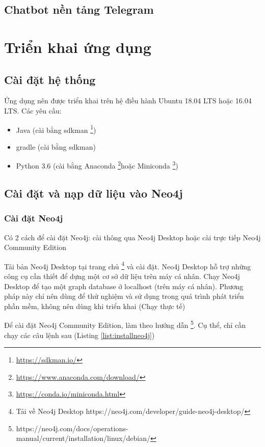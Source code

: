 \subsection{Chatbot nền tảng Telegram}

\section{Triển khai ứng dụng}

\subsection{Cài đặt hệ thống}

Ứng dụng nên được triển khai trên hệ điều hành Ubuntu 18.04 LTS hoặc 16.04 LTS. Các yêu cầu: 

\begin{itemize}
\item Java (cài bằng sdkman \footnote{\url{https://sdkman.io/}})
\item gradle (cài bằng sdkman)
\item Python 3.6 (cài bằng Anaconda \footnote{\url{https://www.anaconda.com/download/}}hoặc Miniconda \footnote{\url{https://conda.io/miniconda.html}})
\end{itemize}

\subsection{Cài đặt và nạp dữ liệu vào Neo4j}
\subsubsection{Cài đặt Neo4j}

Có 2 cách để cài đặt Neo4j: cài thông qua Neo4j Desktop hoặc cài trực tiếp Neo4j Community Edition

Tải bản Neo4j Desktop tại trang chủ \footnote{Tải về Neo4j Desktop https://neo4j.com/developer/guide-neo4j-desktop/} và cài đặt. Neo4j Desktop hỗ trợ những công cụ cần thiết để dựng một cơ sở dữ liệu trên máy cá nhân. Chạy Neo4j Desktop để tạo một graph database ở localhost (trên máy cá nhân). Phương pháp này chỉ nên dùng để thử nghiệm và sử dụng trong quá trình phát triển phần mềm, không nên dùng khi triển khai (Chạy thực tế)

Để cài đặt Neo4j Community Edition, làm theo hướng dẫn \footnote{https://neo4j.com/docs/operations-manual/current/installation/linux/debian/}. Cụ thể, chỉ cần chạy các câu lệnh sau (Listing \ref{list:installneo4j})

